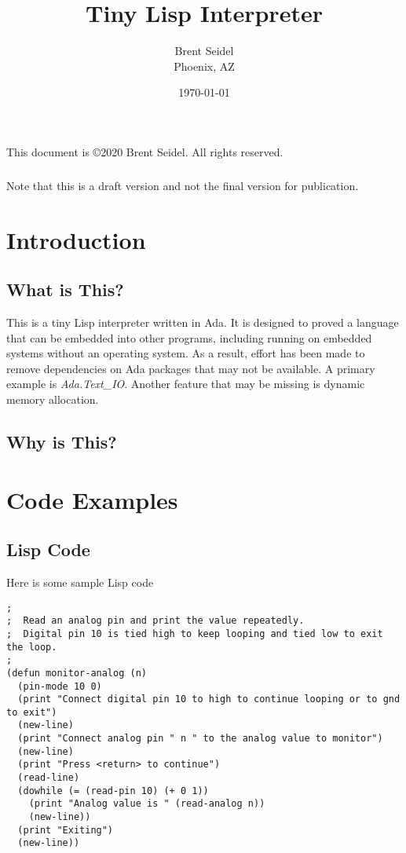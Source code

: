 \documentclass[10pt, openany]{book}
\title{Tiny Lisp Interpreter}
\author{Brent Seidel \\ Phoenix, AZ}
\date{ \today }
\begin{document}
%
%
\frontmatter
\maketitle
\begin{center}
This document is \copyright 2020 Brent Seidel.  All rights reserved.

\paragraph{}Note that this is a draft version and not the final version for publication.
\end{center}
\tableofcontents

\mainmatter

\chapter{Introduction}
\section{What is This?}
This is a tiny Lisp interpreter written in Ada.  It is designed to proved a language that can be embedded into other programs, including running on embedded systems without an operating system.  As a result, effort has been made to remove dependencies on Ada packages that may not be available.  A primary example is \emph{Ada.Text\_IO}.  Another feature that may be missing is dynamic memory allocation.

\section{Why is This?}


\chapter{Code Examples}
\section{Lisp Code}
Here is some sample Lisp code

\lstset{language=lisp}
\begin{lstlisting}
;
;  Read an analog pin and print the value repeatedly.
;  Digital pin 10 is tied high to keep looping and tied low to exit the loop.
;
(defun monitor-analog (n)
  (pin-mode 10 0)
  (print "Connect digital pin 10 to high to continue looping or to gnd to exit")
  (new-line)
  (print "Connect analog pin " n " to the analog value to monitor")
  (new-line)
  (print "Press <return> to continue")
  (read-line)
  (dowhile (= (read-pin 10) (+ 0 1))
    (print "Analog value is " (read-analog n))
    (new-line))
  (print "Exiting")
  (new-line))
\end{lstlisting}
\end{document}
